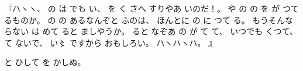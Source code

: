 %
『ハヽヽ、
%
の
は
でも
い、
%
を
く
さへ
すりやあ
いのだ！。
%
や%
の%
の
を
が
つて
るものか。
%
の
の
あるなんぞと
ふのは、
%
ほんとに
の
に
つて
る。
%
もうそんな
らない
は
めて
ると
ましやうか。
%
ると
なぞあ
の
が
て
て、
%
いつでも
くつて、
%
て
ないで、
%
い〻%
ですから
おもしろい。
%
ハヽハヽハ。
』

%
と
ひして
を
かしぬ。

